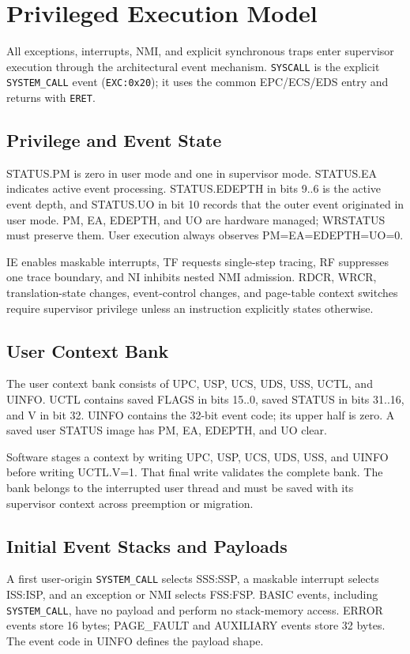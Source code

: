 \clearpage
\section{Privileged Execution Model}\label{page:privileged-execution-model}

All exceptions, interrupts, NMI, and explicit synchronous traps enter supervisor execution through the architectural event mechanism. \texttt{SYSCALL} is the explicit \texttt{SYSTEM\_CALL} event (\texttt{EXC:0x20}); it uses the common EPC/ECS/EDS entry and returns with \texttt{ERET}.

\subsection{Privilege and Event State}
STATUS.PM is zero in user mode and one in supervisor mode. STATUS.EA indicates active event processing. STATUS.EDEPTH in bits 9..6 is the active event depth, and STATUS.UO in bit 10 records that the outer event originated in user mode. PM, EA, EDEPTH, and UO are hardware managed; WRSTATUS must preserve them. User execution always observes PM=EA=EDEPTH=UO=0.

IE enables maskable interrupts, TF requests single-step tracing, RF suppresses one trace boundary, and NI inhibits nested NMI admission. RDCR, WRCR, translation-state changes, event-control changes, and page-table context switches require supervisor privilege unless an instruction explicitly states otherwise.

\subsection{User Context Bank}
The user context bank consists of UPC, USP, UCS, UDS, USS, UCTL, and UINFO. UCTL contains saved FLAGS in bits 15..0, saved STATUS in bits 31..16, and V in bit 32. UINFO contains the 32-bit event code; its upper half is zero. A saved user STATUS image has PM, EA, EDEPTH, and UO clear.

Software stages a context by writing UPC, USP, UCS, UDS, USS, and UINFO before writing UCTL.V=1. That final write validates the complete bank. The bank belongs to the interrupted user thread and must be saved with its supervisor context across preemption or migration.

\subsection{Initial Event Stacks and Payloads}
A first user-origin \texttt{SYSTEM\_CALL} selects SSS:SSP, a maskable interrupt selects ISS:ISP, and an exception or NMI selects FSS:FSP. BASIC events, including \texttt{SYSTEM\_CALL}, have no payload and perform no stack-memory access. ERROR events store 16 bytes; PAGE\_FAULT and AUXILIARY events store 32 bytes. The event code in UINFO defines the payload shape.

